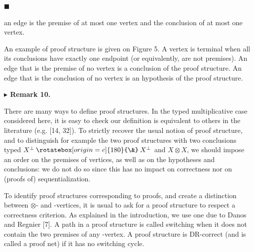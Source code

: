 \documentclass[10pt,a4paper]{amsart}
\providecommand{\invamp}{\mathbin{\rotatebox[origin=c]{180}{\&}}}
\begin{document}
 
 
\par\noindent  $\blacksquare$ 
 
an edge is the premise of at most one vertex and the conclusion of at most one vertex.\par
 
 
  
 
 
An example of proof structure is given on Figure 5. A vertex is terminal when all its conclusions have exactly one endpoint (or equivalently, are not premises). An edge that is the premise of no vertex is a conclusion of the proof structure. An edge that is the conclusion of no vertex is an hypothesis of the proof structure.\par
 
 
 
\par\medskip\noindent\textbf{$\blacktriangleright$ Remark 10.}\par
 
 
There are many ways to define proof structures. In the typed multiplicative case considered here, it is easy to check our definition is equivalent to others in the literature (e.g. [14, 32]). To strictly recover the usual notion of proof structure, and to distinguish for example the two proof structures with two conclusions typed $X^{\perp}\invamp X^{\perp}$ and $X\otimes X$, we should impose an order on the premises of vertices, as well as on the hypotheses and conclusions: we do not do so since this has no impact on correctness nor on (proofs of) sequentialization.\par
 
 
 
 
To identify proof structures corresponding to proofs, and create a distinction between $\otimes$- and -vertices, it is usual to ask for a proof structure to respect a correctness criterion. As explained in the introduction, we use one due to Danos and Regnier [7]. A path in a proof structure is called switching when it does not contain the two premises of any -vertex. A proof structure is DR-correct (and is called a proof net) if it has no switching cycle.\par
 
\end{document}

